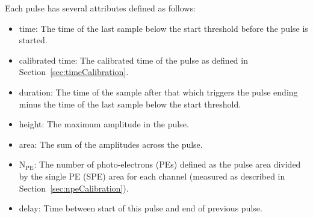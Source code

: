 \documentclass[12pt]{article}
\newcommand{\npe} {\mbox{\ensuremath{\textrm{N}_\textrm{PE}}}\xspace}
\begin{document}
Each pulse has several attributes defined as follows:

\begin{itemize}
    \item time: The time of the last sample below the start threshold before the pulse is started.
    \item calibrated time: The calibrated time of the pulse as defined in Section~\ref{sec:timeCalibration}.
    \item duration: The time of the sample after that which triggers the pulse ending minus the time of the last sample below the start threshold.
    \item height: The maximum amplitude in the pulse.
    \item area: The sum of the amplitudes across the pulse.
    \item \npe: The number of photo-electrons (PEs) defined as the pulse area divided by the single PE (SPE) area for each channel (measured as described in Section~\ref{sec:npeCalibration}).
    \item delay: Time between start of this pulse and end of previous pulse.
\end{itemize}
\end{document}
